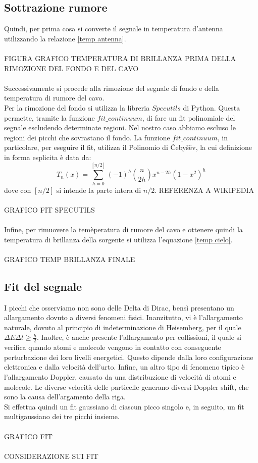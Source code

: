 \subsection{Sottrazione rumore}
Quindi, per prima cosa si converte il segnale in temperatura d'antenna utilizzando la relazione \eqref{temp antenna}.\\\\
FIGURA GRAFICO TEMPERATURA DI BRILLANZA PRIMA DELLA RIMOZIONE DEL FONDO E DEL CAVO\\\\
Successivamente si procede alla rimozione del segnale di fondo e della temperatura di rumore del cavo.\\
Per la rimozione del fondo si utilizza la libreria $Specutils$ di Python. Questa permette, tramite la funzione $fit\_continuum$, di fare un fit polinomiale del segnale escludendo determinate regioni. Nel nostro caso abbiamo escluso le regioni dei picchi che sovrastano il fondo. La funzione $fit\_continuum$, in particolare, per eseguire il fit, utilizza il Polinomio di Čebyšëv, la cui definizione in forma esplicita è data da:
\begin{equation}
    T_n(x)=\sum_{h=0}^{[n/2]} (-1)^h {n \choose 2h} x^{n-2h} (1-x^2)^h
\end{equation}
dove con $[n/2]$ si intende la parte intera di $n/2$. REFERENZA A WIKIPEDIA\\\\GRAFICO FIT SPECUTILS\\\\
Infine, per rimuovere la temèperatura di rumore del cavo e ottenere quindi la temperatura di brillanza della sorgente si utilizza l'equazione \eqref{temp cielo}.\\\\GRAFICO TEMP BRILLANZA FINALE

\subsection{Fit del segnale}
I picchi che osserviamo non sono delle Delta di Dirac, bensì presentano un allargamento dovuto a diversi fenomeni fisici. Inanzitutto, vi è l'allargamento naturale, dovuto al principio di indeterminazione di Heisemberg, per il quale $\Delta E\Delta t\geq\frac{\hbar}{2}$. Inoltre, è anche presente l'allargamento per collissioni, il quale si verifica quando atomi e molecole vengono in contatto con conseguente perturbazione dei loro livelli energetici. Questo dipende dalla loro configurazione elettronica e dalla velocità dell'urto. Infine, un altro tipo di fenomeno tipico è l'allargamento Doppler, causato da una distribuzione di velocità di atomi e molecole. Le diverse velocità delle particelle generano diversi Doppler shift, che sono la causa dell'argamento della riga.\\
Si effettua quindi un fit gaussiano di ciascun picco singolo e, in seguito, un fit multigaussiano dei tre picchi insieme.\\\\
GRAFICO FIT \\\\CONSIDERAZIONE SUI FIT\\\\

